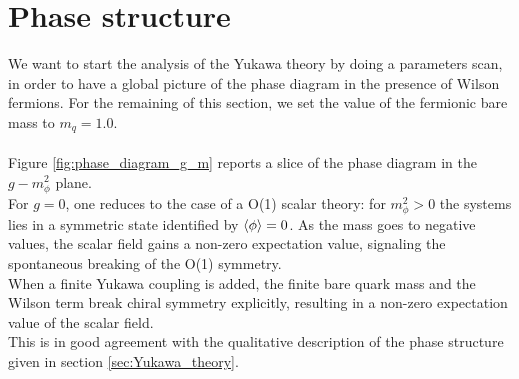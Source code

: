 \section{Phase structure}
We want to start the analysis of the Yukawa theory by doing a parameters scan, in order to have a global picture of the phase diagram in the presence of Wilson fermions. For the remaining of this section, we set the value of the fermionic bare mass to $m_q = 1.0$.\\~\\
Figure \ref{fig:phase_diagram_g_m} reports a slice of the phase diagram in the $g-m_\phi^2$ plane. \\
For $g=0$, one reduces to the case of a O(1) scalar theory: for $m_\phi^2>0$ the systems lies in a symmetric state identified by $\left\langle \phi \right\rangle = 0$. 
As the mass goes to negative values, the scalar field gains a non-zero expectation value, signaling the spontaneous breaking of the O(1) symmetry. \\
When a finite Yukawa coupling is added, the finite bare quark mass and the Wilson term break chiral symmetry explicitly, resulting in a non-zero expectation value of the scalar field. \\
This is in good agreement with the qualitative description of the phase structure given in section \ref{sec:Yukawa_theory}.
